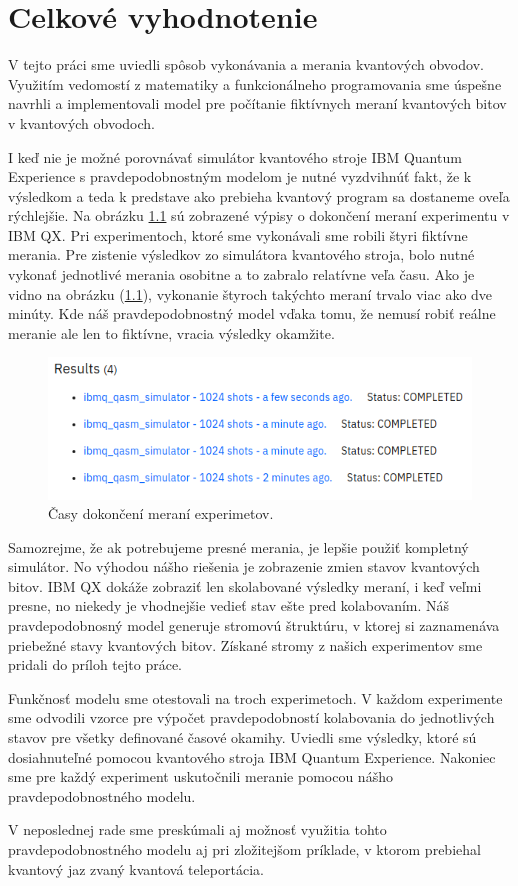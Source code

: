 
\chapter{Celkové vyhodnotenie}

V tejto práci sme uviedli spôsob vykonávania a merania kvantových obvodov.
Využitím vedomostí z matematiky a funkcionálneho programovania sme úspešne 
navrhli a implementovali model pre počítanie fiktívnych meraní kvantových
bitov v kvantových obvodoch.

I keď nie je možné porovnávať simulátor kvantového stroje IBM Quantum
Experience s pravdepodobnostným modelom je nutné vyzdvihnúť fakt, že k
výsledkom a teda k predstave ako prebieha kvantový program sa dostaneme 
oveľa rýchlejšie. Na obrázku \ref{expr_time} sú zobrazené výpisy o dokončení
meraní experimentu v IBM QX. Pri experimentoch, ktoré sme vykonávali sme 
robili štyri fiktívne merania. Pre zistenie výsledkov zo simulátora kvantového
stroja, bolo nutné vykonať jednotlivé merania osobitne a to zabralo relatívne
veľa času. Ako je vidno na obrázku (\ref{expr_time}), vykonanie štyroch 
takýchto meraní trvalo viac ako dve minúty. Kde náš pravdepodobnostný model
vďaka tomu, že nemusí robiť reálne meranie ale len to fiktívne, vracia 
výsledky okamžite. 

\begin{figure}
	\centering 
	\includegraphics[width=.8\textwidth]{figures/time_expr.png} 
	\caption{Časy dokončení meraní experimetov.}
    \label{expr_time}
\end{figure}


Samozrejme, že ak potrebujeme presné merania, je lepšie použiť kompletný
simulátor. No výhodou nášho riešenia je zobrazenie zmien stavov kvantových
bitov. IBM QX dokáže zobraziť len skolabované výsledky meraní, i keď veľmi
presne, no niekedy je vhodnejšie vedieť stav ešte pred kolabovaním. Náš 
pravdepodobnosný model generuje stromovú štruktúru, v ktorej si zaznamenáva
priebežné stavy kvantových bitov. Získané stromy z našich experimentov sme 
pridali do príloh tejto práce.

Funkčnosť modelu sme otestovali na troch experimetoch. V každom experimente 
sme odvodili vzorce pre výpočet pravdepodobností kolabovania do jednotlivých
stavov pre všetky definované časové okamihy. Uviedli sme výsledky, ktoré 
sú dosiahnuteľné pomocou kvantového stroja IBM Quantum Experience. Nakoniec 
sme pre každý experiment uskutočnili meranie pomocou nášho pravdepodobnostného
modelu.

V neposlednej rade sme preskúmali aj možnosť využitia tohto pravdepodobnostného
modelu aj pri zložitejšom príklade, v ktorom prebiehal kvantový jaz zvaný
kvantová teleportácia.
